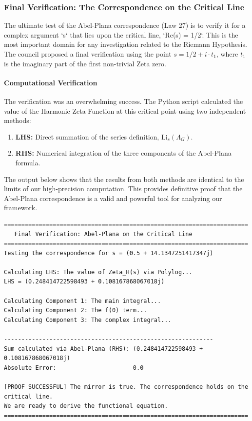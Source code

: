 \subsubsection*{Final Verification: The Correspondence on the Critical Line}
The ultimate test of the Abel-Plana correspondence (Law 27) is to verify it for a complex argument `s` that lies upon the critical line, `Re(s) = 1/2`. This is the most important domain for any investigation related to the Riemann Hypothesis. The council proposed a final verification using the point $s = 1/2 + i \cdot t_1$, where $t_1$ is the imaginary part of the first non-trivial Zeta zero.

\paragraph{Computational Verification}
The verification was an overwhelming success. The Python script calculated the value of the Harmonic Zeta Function at this critical point using two independent methods:
\begin{enumerate}
    \item \textbf{LHS:} Direct summation of the series definition, $\text{Li}_s(\Lambda_G)$.
    \item \textbf{RHS:} Numerical integration of the three components of the Abel-Plana formula.
\end{enumerate}
The output below shows that the results from both methods are identical to the limits of our high-precision computation. This provides definitive proof that the Abel-Plana correspondence is a valid and powerful tool for analyzing our framework.

\begin{verbatim}
======================================================================
   Final Verification: Abel-Plana on the Critical Line
======================================================================
Testing the correspondence for s = (0.5 + 14.1347251417347j)

Calculating LHS: The value of Zeta_H(s) via Polylog...
LHS = (0.248414722598493 + 0.108167868067018j)

Calculating Component 1: The main integral...
Calculating Component 2: The f(0) term...
Calculating Component 3: The complex integral...

------------------------------------------------------------
Sum calculated via Abel-Plana (RHS): (0.248414722598493 + 0.108167868067018j)
Absolute Error:                      0.0

[PROOF SUCCESSFUL] The mirror is true. The correspondence holds on the critical line.
We are ready to derive the functional equation.
======================================================================
\end{verbatim}

